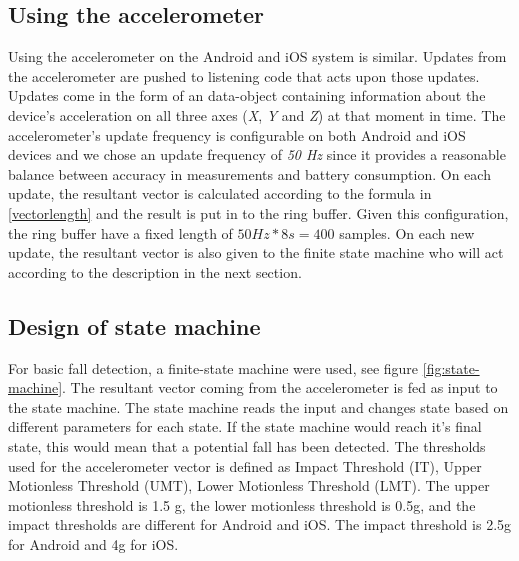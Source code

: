 \documentclass[12pt, a4paper, onecolumn]{article}
\begin{document}
		\subsection{Using the accelerometer}
		Using the accelerometer on the Android and iOS system is similar. Updates from the accelerometer are pushed to listening code that acts upon those updates. Updates come in the form of an data-object containing information about the device's acceleration on all three axes (\textit{X}, \textit{Y} and \textit{Z}) at that moment in time. The accelerometer's update frequency is configurable on both Android and iOS devices and we chose an update frequency of \textit{50 Hz} since it provides a reasonable balance between accuracy in measurements and battery consumption. On each update, the resultant vector is calculated according to the formula in \ref{vectorlength} and the result is put in to the ring buffer. Given this configuration, the ring buffer have a fixed length of \(50 Hz * 8s = 400\) samples. On each new update, the resultant vector is also given to the finite state machine who will act according to the description in the next section.
	
	
	
	\subsection{Design of state machine}
	
	For basic fall detection, a finite-state machine were used, see figure \ref{fig:state-machine}. The resultant vector coming from the accelerometer is fed as input to the state machine. The state machine reads the input and changes state based on different parameters for each state. If the state machine would reach it's final state, this would mean that a potential fall has been detected. The thresholds used for the accelerometer vector is defined as Impact Threshold (IT), Upper Motionless Threshold (UMT), Lower Motionless Threshold (LMT). The upper motionless threshold is 1.5 g, the lower motionless threshold is 0.5g, and the impact thresholds are different for Android and iOS. The impact threshold is 2.5g for Android and 4g for iOS. 
	
\end{document}
